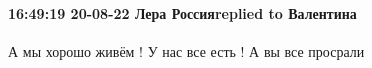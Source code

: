  
 
 
 
 

\paragraph{16:49:19 20-08-22 Лера Россияreplied to Валентина}

А мы хорошо живём ! У нас все есть ! А вы все просрали
